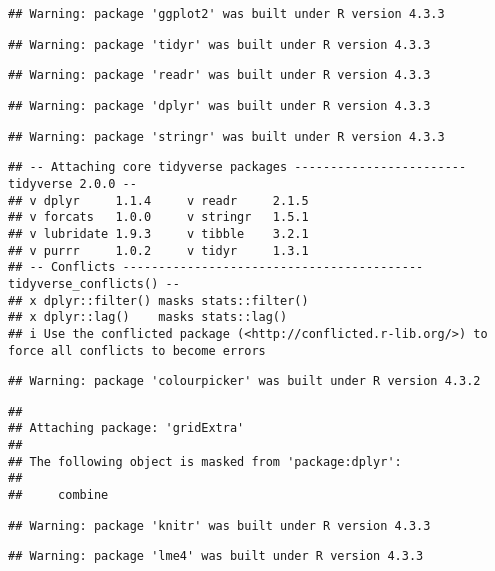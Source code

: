 \documentclass[
]{article}
\begin{document}
\begin{verbatim}
## Warning: package 'ggplot2' was built under R version 4.3.3
\end{verbatim}

\begin{verbatim}
## Warning: package 'tidyr' was built under R version 4.3.3
\end{verbatim}

\begin{verbatim}
## Warning: package 'readr' was built under R version 4.3.3
\end{verbatim}

\begin{verbatim}
## Warning: package 'dplyr' was built under R version 4.3.3
\end{verbatim}

\begin{verbatim}
## Warning: package 'stringr' was built under R version 4.3.3
\end{verbatim}

\begin{verbatim}
## -- Attaching core tidyverse packages ------------------------ tidyverse 2.0.0 --
## v dplyr     1.1.4     v readr     2.1.5
## v forcats   1.0.0     v stringr   1.5.1
## v lubridate 1.9.3     v tibble    3.2.1
## v purrr     1.0.2     v tidyr     1.3.1
## -- Conflicts ------------------------------------------ tidyverse_conflicts() --
## x dplyr::filter() masks stats::filter()
## x dplyr::lag()    masks stats::lag()
## i Use the conflicted package (<http://conflicted.r-lib.org/>) to force all conflicts to become errors
\end{verbatim}

\begin{verbatim}
## Warning: package 'colourpicker' was built under R version 4.3.2
\end{verbatim}

\begin{verbatim}
## 
## Attaching package: 'gridExtra'
## 
## The following object is masked from 'package:dplyr':
## 
##     combine
\end{verbatim}

\begin{verbatim}
## Warning: package 'knitr' was built under R version 4.3.3
\end{verbatim}

\begin{verbatim}
## Warning: package 'lme4' was built under R version 4.3.3
\end{verbatim}
\end{document}
